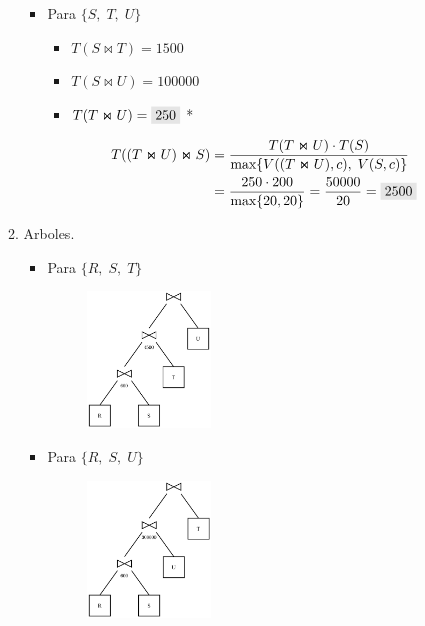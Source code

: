 \documentclass{templateNote}
\newcommand{\newparagraph}{\par\vspace{\baselineskip}\noindent}
\begin{document}
\begin{enumerate}
\begin{enumerate}[label=\arabic*)]
\begin{itemize}
            \item Para $\{S, \; T, \; U\}$
            \begin{itemize}
                \item $T(S \Join T) = 1500$
                \item $T(S \Join U) = 100000$
                \item $T(T \Join U) = \colorbox{gray!20}{250}$ *
            \end{itemize}
            \begin{align*}
                T((T \Join U) \Join S) &= \displaystyle\frac{T(T \Join U) \cdot T(S)}{\text{max}\{V((T \Join U),c), \; V(S,c)\}} \\
                &= \frac{250 \cdot 200}{\text{max}\{20, 20\}} = \frac{50000}{20} = \colorbox{gray!20}{2500}
            \end{align*}
            \newparagraph
        \end{itemize}
        
        \item Arboles.
        \begin{itemize}
            \item Para $\{R, \; S, \; T\}$
            \begin{figure}[H]
                \centering
                \includegraphics[width=0.35\textwidth]{img/E3-A1.png}
            \end{figure}

            \newpage
            \item Para $\{R, \; S, \; U\}$
            \begin{figure}[H]
                \centering
                \includegraphics[width=0.35\textwidth]{img/E3-A2.png}
            \end{figure}


\end{itemize}
\end{enumerate}
\end{enumerate}
\end{document}

